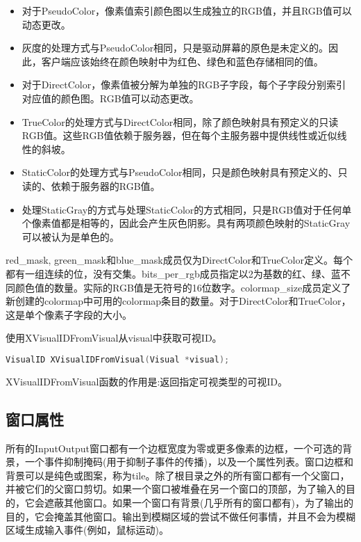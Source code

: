 \begin{itemize}
	\item 对于PseudoColor，像素值索引颜色图以生成独立的RGB值，并且RGB值可以动态更改。
	\item 灰度的处理方式与PseudoColor相同，只是驱动屏幕的原色是未定义的。因此，客户端应该始终在颜色映射中为红色、绿色和蓝色存储相同的值。
	\item 对于DirectColor，像素值被分解为单独的RGB子字段，每个子字段分别索引对应值的颜色图。RGB值可以动态更改。
	\item TrueColor的处理方式与DirectColor相同，除了颜色映射具有预定义的只读RGB值。这些RGB值依赖于服务器，但在每个主服务器中提供线性或近似线性的斜坡。
	\item StaticColor的处理方式与PseudoColor相同，只是颜色映射具有预定义的、只读的、依赖于服务器的RGB值。
	\item 处理StaticGray的方式与处理StaticColor的方式相同，只是RGB值对于任何单个像素值都是相等的，因此会产生灰色阴影。具有两项颜色映射的StaticGray可以被认为是单色的。
\end{itemize}

red\_mask, green\_mask和blue\_mask成员仅为DirectColor和TrueColor定义。每个都有一组连续的位，没有交集。bits\_per\_rgb成员指定以2为基数的红、绿、蓝不同颜色值的数量。实际的RGB值是无符号的16位数字。colormap\_size成员定义了新创建的colormap中可用的colormap条目的数量。对于DirectColor和TrueColor，这是单个像素子字段的大小。

\noindent 使用XVisualIDFromVisual从visual中获取可视ID。
\begin{lstlisting}[language=C]
VisualID XVisualIDFromVisual(Visual *visual);
\end{lstlisting}

\noindent XVisualIDFromVisual函数的作用是:返回指定可视类型的可视ID。

\subsection{窗口属性}

所有的InputOutput窗口都有一个边框宽度为零或更多像素的边框，一个可选的背景，一个事件抑制掩码(用于抑制子事件的传播)，以及一个属性列表。窗口边框和背景可以是纯色或图案，称为tile。除了根目录之外的所有窗口都有一个父窗口，并被它们的父窗口剪切。如果一个窗口被堆叠在另一个窗口的顶部，为了输入的目的，它会遮蔽其他窗口。如果一个窗口有背景(几乎所有的窗口都有)，为了输出的目的，它会掩盖其他窗口。输出到模糊区域的尝试不做任何事情，并且不会为模糊区域生成输入事件(例如，鼠标运动)。

